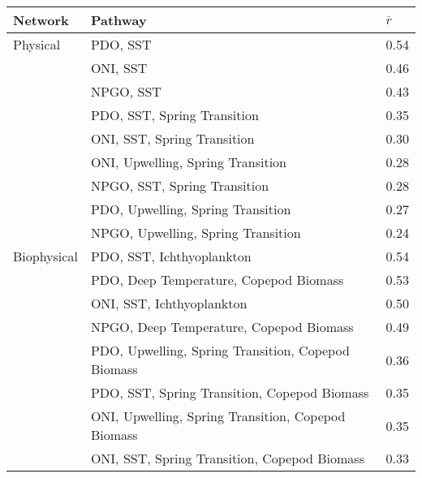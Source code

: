 \begin{tabular}{lll}
  \hline
Network & Pathway & $\overline{r}$ \\ 
  \hline
Physical & PDO, SST  & 0.54 \\ 
   & ONI, SST  & 0.46 \\ 
   & NPGO, SST  & 0.43 \\ 
   & PDO, SST, Spring Transition  & 0.35 \\ 
   & ONI, SST, Spring Transition  & 0.30 \\ 
   & ONI, Upwelling, Spring Transition  & 0.28 \\ 
   & NPGO, SST, Spring Transition  & 0.28 \\ 
   & PDO, Upwelling, Spring Transition  & 0.27 \\ 
   & NPGO, Upwelling, Spring Transition  & 0.24 \\ 
  Biophysical & PDO, SST, Ichthyoplankton  & 0.54 \\ 
   & PDO, Deep Temperature, Copepod Biomass  & 0.53 \\ 
   & ONI, SST, Ichthyoplankton  & 0.50 \\ 
   & NPGO, Deep Temperature, Copepod Biomass  & 0.49 \\ 
   & PDO, Upwelling, Spring Transition, Copepod Biomass  & 0.36 \\ 
   & PDO, SST, Spring Transition, Copepod Biomass  & 0.35 \\ 
   & ONI, Upwelling, Spring Transition, Copepod Biomass  & 0.35 \\ 
   & ONI, SST, Spring Transition, Copepod Biomass  & 0.33 \\ 
   \hline
\end{tabular}
